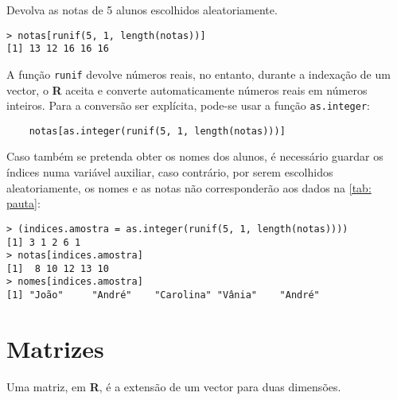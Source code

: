 \documentclass{exam}
\begin{document}
\begin{questions}
\question Devolva as notas de 5 alunos escolhidos aleatoriamente.
\begin{solution}
	\begin{verbatim}
> notas[runif(5, 1, length(notas))]
[1] 13 12 16 16 16
	\end{verbatim}
	A função \texttt{runif} devolve números reais, no entanto, durante a indexação de um vector, o \textbf{R} aceita e converte automaticamente números reais em números inteiros. Para a conversão ser explícita, pode-se usar a função \texttt{as.integer}:
	\begin{verbatim}
	notas[as.integer(runif(5, 1, length(notas)))]
	\end{verbatim}
	Caso também se pretenda obter os nomes dos alunos, é necessário guardar os índices numa variável auxiliar, caso contrário, por serem escolhidos aleatoriamente, os nomes e as notas não corresponderão aos dados na \autoref{tab: pauta}:
	\begin{verbatim}
> (indices.amostra = as.integer(runif(5, 1, length(notas))))
[1] 3 1 2 6 1
> notas[indices.amostra]
[1]  8 10 12 13 10
> nomes[indices.amostra]
[1] "João"     "André"    "Carolina" "Vânia"    "André"   
	\end{verbatim}
\end{solution}

\end{questions}

\section{Matrizes}
Uma matriz, em \textbf{R}, é a extensão de um vector para duas dimensões.
\end{document}
